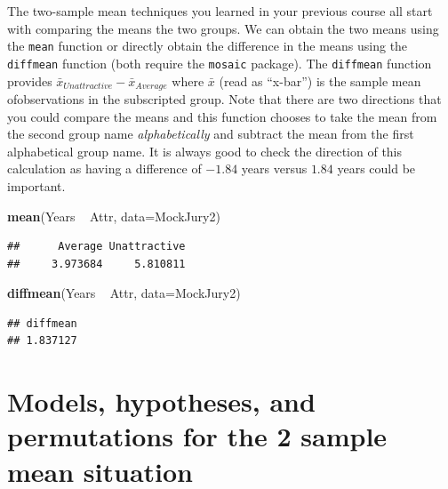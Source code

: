 \documentclass[]{book}
\newenvironment{Shaded}{\begin{snugshade}}{\end{snugshade}}
\newcommand{\KeywordTok}[1]{\textcolor[rgb]{0.13,0.29,0.53}{\textbf{{#1}}}}
\newcommand{\DataTypeTok}[1]{\textcolor[rgb]{0.13,0.29,0.53}{{#1}}}
\newcommand{\StringTok}[1]{\textcolor[rgb]{0.31,0.60,0.02}{{#1}}}
\newcommand{\NormalTok}[1]{{#1}}
\begin{document}
The two-sample mean techniques you learned in your previous course all
start with comparing the means the two groups. We can obtain the two
means using the \texttt{mean} function or directly obtain the difference
in the means using the \texttt{diffmean} function (both require the
\texttt{mosaic} package). The \texttt{diffmean} function provides
\(\bar{x}_{Unattractive} - \bar{x}_{Average}\) where \(\bar{x}\) (read
as ``x-bar'') is the sample mean ofobservations in the subscripted
group. Note that there are two directions that you could compare the
means and this function chooses to take the mean from the second group
name \emph{alphabetically} and subtract the mean from the first
alphabetical group name. It is always good to check the direction of
this calculation as having a difference of \(-1.84\) years versus
\(1.84\) years could be important.

\begin{Shaded}
\begin{Highlighting}[]
\KeywordTok{mean}\NormalTok{(Years ~}\StringTok{ }\NormalTok{Attr, }\DataTypeTok{data=}\NormalTok{MockJury2)}
\end{Highlighting}
\end{Shaded}

\begin{verbatim}
##      Average Unattractive 
##     3.973684     5.810811
\end{verbatim}

\begin{Shaded}
\begin{Highlighting}[]
\KeywordTok{diffmean}\NormalTok{(Years ~}\StringTok{ }\NormalTok{Attr, }\DataTypeTok{data=}\NormalTok{MockJury2)}
\end{Highlighting}
\end{Shaded}

\begin{verbatim}
## diffmean 
## 1.837127
\end{verbatim}

\section{Models, hypotheses, and permutations for the 2 sample mean
situation}\label{section_2-3}
\end{document}
